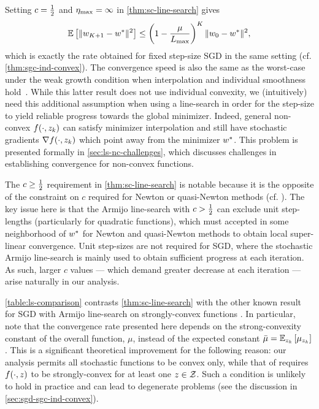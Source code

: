 Setting \( c = \frac 1 2 \) and \( \eta_{\text{max}} = \infty \) in \autoref{thm:sc-line-search} gives  
\[ \mathbb{E}\left[\|w_{K+1} - w^*\|^2\right] \leq \left(1 - \frac{\mu}{L_{\text{max}}}\right)^K \|w_0 - w^*\|^2, \]
which is exactly the rate obtained for fixed step-size \ac{SGD} in the same setting (cf. \autoref{thm:sgc-ind-convex}). 
The convergence speed is also the same as the worst-case under the weak growth condition when interpolation and individual smoothness hold~\citep[Theorem 5]{vaswani2019fast}.
While this latter result does not use individual convexity, we (intuitively) need this additional assumption when using a line-search in order for the step-size to yield reliable progress towards the global minimizer.
Indeed, general non-convex \( f(\cdot, z_{k}) \) can satisfy minimizer interpolation and still have stochastic gradients \( \nabla f(\cdot, z_{k}) \) which point away from the minimizer \( w^* \).
This problem is presented formally in \autoref{sec:ls-nc-challenges}, which discusses challenges in establishing convergence for non-convex functions.

The \( c \geq \frac 1 2 \) requirement in \autoref{thm:sc-line-search} is notable because it is the opposite of the constraint on \( c \) required for Newton or quasi-Newton methods (cf. \citet[Theorem 3.6]{nocedal1999numerical}). 
The key issue here is that the Armijo line-search with \( c > \frac 1 2 \) can exclude unit step-lengths (particularly for quadratic functions), which must accepted in some neighborhood of \( w^* \) for Newton and quasi-Newton methods to obtain local super-linear convergence. 
Unit step-sizes are not required for \ac{SGD}, where the stochastic Armijo line-search is mainly used to obtain sufficient progress at each iteration.
As such, larger \( c \) values --- which demand greater decrease at each iteration --- arise naturally in our analysis.



\autoref{table:ls-comparison} contrasts \autoref{thm:sc-line-search} with the other known result for \ac{SGD} with Armijo line-search on strongly-convex functions \citep[Theorem 1]{vaswani2019painless}. 
In particular, note that the convergence rate presented here depends on the strong-convexity constant of the overall function, \( \mu \), instead of the expected constant \( \bar \mu = \mathbb{E}_{z_{k}} \left[\mu_{z_{k}}\right] \).
This is a significant theoretical improvement for the following reason: our analysis permits all stochastic functions to be convex only, while that of \citet{vaswani2019painless} requires \( f(\cdot, z) \) to be strongly-convex for at least one \( z \in \mathcal{Z} \).
Such a condition is unlikely to hold in practice and can lead to degenerate problems (see the discussion in \autoref{sec:sgd-sgc-ind-convex}).


